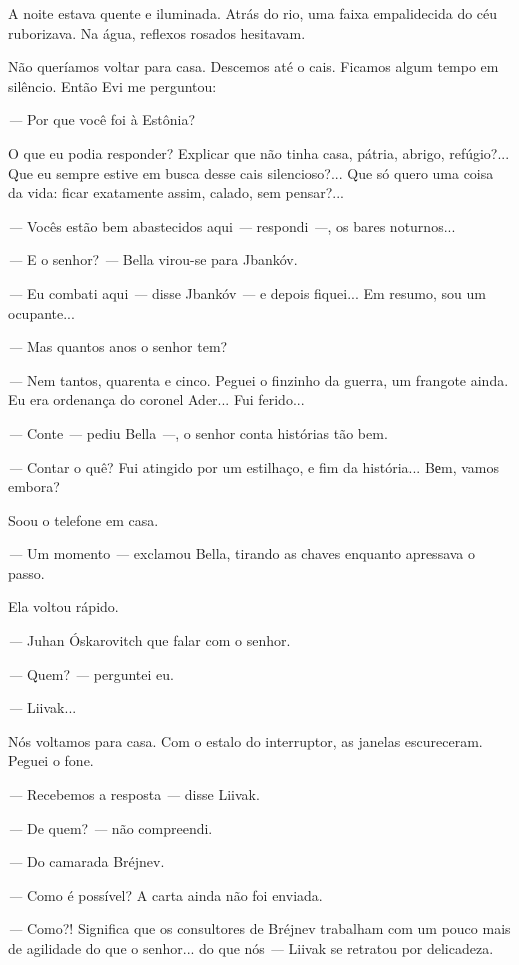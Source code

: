A noite estava quente e iluminada. Atrás do rio, uma faixa empalidecida
do céu ruborizava. Na água, reflexos rosados hesitavam.

Não queríamos voltar para casa. Descemos até o cais. Ficamos algum tempo
em silêncio. Então Evi me perguntou:

\emph{---} Por que você foi à Estônia?

O que eu podia responder? Explicar que não tinha casa, pátria, abrigo,
refúgio?... Que eu sempre estive em busca desse cais silencioso?... Que
só quero uma coisa da vida: ficar exatamente assim, calado, sem
pensar?...

\emph{---} Vocês estão bem abastecidos aqui \emph{---} respondi
\emph{---}, os bares noturnos...

\emph{---} E o senhor? \emph{---} Bella virou-se para Jbankóv.

\emph{---} Eu combati aqui \emph{---} disse Jbankóv \emph{---} e depois
fiquei... Em resumo, sou um ocupante...

\emph{---} Mas quantos anos o senhor tem?

\emph{---} Nem tantos, quarenta e cinco. Peguei o finzinho da guerra, um
frangote ainda. Eu era ordenança do coronel Ader... Fui ferido...

\emph{---} Conte \emph{---} pediu Bella \emph{---}, o senhor conta
histórias tão bem.

\emph{---} Contar o quê? Fui atingido por um estilhaço, e fim da
história... Bеm, vamos embora?

Soou o telefone em casa.

\emph{---} Um momento \emph{---} exclamou Bella, tirando as chaves
enquanto apressava o passo.

Ela voltou rápido.

\emph{---} Juhan Óskarovitch que falar com o senhor.

\emph{---} Quem? \emph{---} perguntei eu.

\emph{---} Liivak...

Nós voltamos para casa. Com o estalo do interruptor, as janelas
escureceram. Peguei o fone.

\emph{---} Recebemos a resposta \emph{---} disse Liivak.

\emph{---} De quem? \emph{---} não compreendi.

\emph{---} Do camarada Bréjnev.

\emph{---} Como é possível? A carta ainda não foi enviada.

\emph{---} Como?! Significa que os consultores de Bréjnev trabalham com
um pouco mais de agilidade do que o senhor... do que nós \emph{---}
Liivak se retratou por delicadeza.

